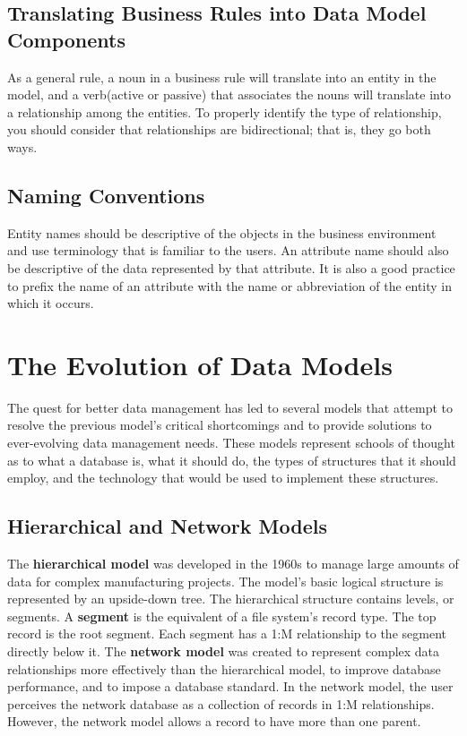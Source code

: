 \documentclass[a4paper, 12pt, titlepage]{report}
\begin{document}
\subsection{Translating Business Rules into Data Model Components}
As a general rule, a noun in a business rule will translate into an entity in the model, and a verb(active or passive) that associates the nouns will translate into a relationship among the entities. To properly identify the type of relationship, you should consider that relationships are bidirectional; that is, they go both ways.
\subsection{Naming Conventions}
Entity names should be descriptive of the objects in the business environment and use terminology that is familiar to the users. An attribute name should also be descriptive of the data represented by that attribute. It is also a good practice to prefix the name of an attribute with the name or abbreviation of the entity in which it occurs.
\section{The Evolution of Data Models}
The quest for better data management has led to several models that attempt to resolve the previous model’s critical shortcomings and to provide solutions to ever-evolving data management needs. These models represent schools of thought as to what a database is, what it should do, the types of structures that it should employ, and the technology that would be used to implement these structures.
\subsection{Hierarchical and Network Models}
The \textbf{hierarchical model} was developed in the 1960s to manage large amounts of data for complex manufacturing projects. The model’s basic logical structure is represented by an upside-down tree. The hierarchical structure contains levels, or segments. A \textbf{segment} is the equivalent of a file system’s record type. The top record is the root segment. Each segment has a 1:M relationship to the segment directly below it.
The \textbf{network model} was created to represent complex data relationships more effectively than the hierarchical model, to improve database performance, and to impose a database standard. In the network model, the user perceives the network database as a collection of records in 1:M relationships. However, the network model allows a record to have more than one parent. 
\end{document}
